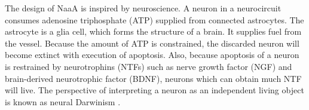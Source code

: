 The design of NaaA is inspired by neuroscience.
A neuron in a neurocircuit consumes adenosine triphosphate (ATP) supplied from connected astrocytes.
The astrocyte is a glia cell, which forms the structure of a brain. It supplies fuel from the vessel.
Because the amount of ATP is constrained, the discarded neuron will become extinct with execution of apoptosis.
Also, because apoptosis of a neuron is restrained by neurotrophins (NTFs) such as nerve growth factor (NGF) and brain-derived neurotrophic factor (BDNF),
neurons which can obtain much NTF will live.
The perspective of interpreting a neuron as an independent living object is known as neural Darwinism \citep{edelman1987neural}.
